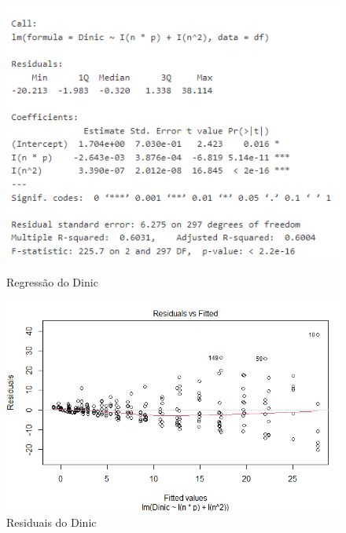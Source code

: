 \documentclass{uofa-eng-assignment}
\begin{document}
\begin{figure}[h]
    \centering
    \begin{minipage}{0.45\textwidth}
        \centering
        \includegraphics[width=1\textwidth]{lm dinic 2.png}
        \caption{Regressão do Dinic}
        \label{fig:dinic-regression-2}
    \end{minipage}
    \hfill
    \begin{minipage}{0.45\textwidth}
        \centering
        \includegraphics[width=1\textwidth]{residuals-dinic.png}
        \caption{Residuais do Dinic}
        \label{fig:dinic-residuals}
    \end{minipage}
\end{figure}





\WFclear
\newpage
\end{document}
